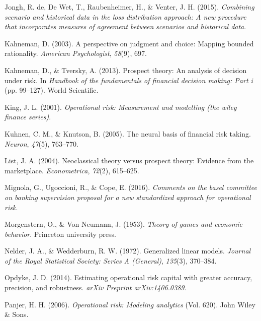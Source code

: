 \documentclass{DissertateUSU}
\begin{document}
\leavevmode\hypertarget{ref-de2015combining}{}%
Jongh, R. de, De Wet, T., Raubenheimer, H., \& Venter, J. H. (2015).
\emph{Combining scenario and historical data in the loss distribution
approach: A new procedure that incorporates measures of agreement
between scenarios and historical data}.

\leavevmode\hypertarget{ref-kahneman2003perspective}{}%
Kahneman, D. (2003). A perspective on judgment and choice: Mapping
bounded rationality. \emph{American Psychologist}, \emph{58}(9), 697.

\leavevmode\hypertarget{ref-kahneman2013prospect}{}%
Kahneman, D., \& Tversky, A. (2013). Prospect theory: An analysis of
decision under risk. In \emph{Handbook of the fundamentals of financial
decision making: Part i} (pp. 99--127). World Scientific.

\leavevmode\hypertarget{ref-king2001operational}{}%
King, J. L. (2001). \emph{Operational risk: Measurement and modelling
(the wiley finance series)}.

\leavevmode\hypertarget{ref-kuhnen2005neural}{}%
Kuhnen, C. M., \& Knutson, B. (2005). The neural basis of financial risk
taking. \emph{Neuron}, \emph{47}(5), 763--770.

\leavevmode\hypertarget{ref-list2004neoclassical}{}%
List, J. A. (2004). Neoclassical theory versus prospect theory: Evidence
from the marketplace. \emph{Econometrica}, \emph{72}(2), 615--625.

\leavevmode\hypertarget{ref-mignola2016comments}{}%
Mignola, G., Ugoccioni, R., \& Cope, E. (2016). \emph{Comments on the
basel committee on banking supervision proposal for a new standardized
approach for operational risk}.

\leavevmode\hypertarget{ref-morgenstern1953theory}{}%
Morgenstern, O., \& Von Neumann, J. (1953). \emph{Theory of games and
economic behavior}. Princeton university press.

\leavevmode\hypertarget{ref-nelder1972generalized}{}%
Nelder, J. A., \& Wedderburn, R. W. (1972). Generalized linear models.
\emph{Journal of the Royal Statistical Society: Series A (General)},
\emph{135}(3), 370--384.

\leavevmode\hypertarget{ref-opdyke2014estimating}{}%
Opdyke, J. D. (2014). Estimating operational risk capital with greater
accuracy, precision, and robustness. \emph{arXiv Preprint
arXiv:1406.0389}.

\leavevmode\hypertarget{ref-panjer2006operational}{}%
Panjer, H. H. (2006). \emph{Operational risk: Modeling analytics} (Vol.
620). John Wiley \& Sons.
\end{document}
